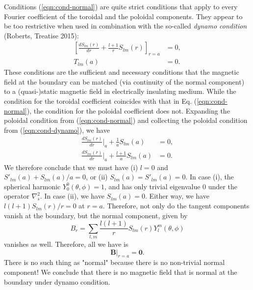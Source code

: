 \documentclass[a4paper, 11pt]{article}
\begin{document}
Conditions (\ref{eqn:cond-normal}) are quite strict conditions that apply to every Fourier coefficient of the toroidal and the poloidal components. They appear to be too restrictive when used in combination with the so-called \textit{dynamo condition} (Roberts, Treatise 2015):
\begin{equation}\label{eqn:cond-dynamo}
\begin{aligned}
    \left[\frac{dS_{lm}(r)}{dr} + \frac{l+1}{r} S_{lm}(r)\right]_{r=a} &= 0,\\
    T_{lm}(a) &= 0.
\end{aligned}
\end{equation}
These conditions are the sufficient and necessary conditions that the magnetic field at the boundary can be matched (via continuity of the normal component) to a (quasi-)static magnetic field in electrically insulating medium.
While the condition for the toroidal coefficient coincides with that in Eq. (\ref{eqn:cond-normal}), the condition for the poloidal coefficient does not. Expanding the poloidal condition from (\ref{eqn:cond-normal}) and collecting the poloidal condition from (\ref{eqn:cond-dynamo}), we have
\begin{equation}
    \begin{aligned}
        \frac{dS_{lm}(r)}{dr}\Big|_{a} + \frac{1}{a} S_{lm}(a) &= 0, \\
        \frac{dS_{lm}(r)}{dr}\Big|_{a} + \frac{l+1}{a} S_{lm}(a) &= 0.
    \end{aligned}
\end{equation}
We therefore conclude that we must have (i) $l=0$ and $S'_{lm}(a) + S_{lm}(a)/a = 0$, or (ii) $S_{lm}(a) = S'_{lm}(a) = 0$.
In case (i), the spherical harmonic $Y_{0}^0(\theta, \phi) = 1$, and has only trivial eigenvalue $0$ under the operator $\nabla_s^2$. In case (ii), we have $S_{lm}(a) = 0$. Either way, we have $l(l+1) S_{lm}(r)/r = 0$ at $r=a$. Therefore, not only do the tangent components vanish at the boundary, but the normal component, given by
\[
    B_r = \sum_{l,m} \frac{l(l+1)}{r} S_{lm}(r) Y_l^m(\theta, \phi)
\]
vanishes as well. Therefore, all we have is 
\begin{equation}
    \mathbf{B}|_{r=a} = \mathbf{0}.
\end{equation}
There is no such thing as "normal" because there is no non-trivial normal component! We conclude that there is no magnetic field that is normal at the boundary under dynamo condition.
\end{document}
